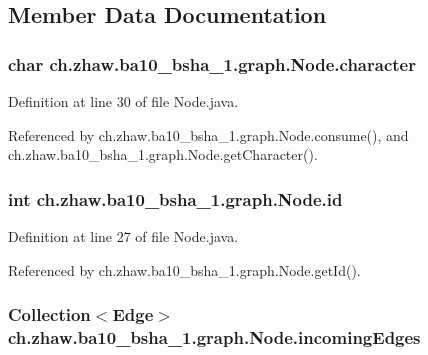 \subsection{Member Data Documentation}
\hypertarget{classch_1_1zhaw_1_1ba10__bsha__1_1_1graph_1_1Node_ab6bd424b381dc0f19d9f49d0b2cb56fc}{
\subsubsection[{character}]{\setlength{\rightskip}{0pt plus 5cm}char {\bf ch.zhaw.ba10\_\-bsha\_\-1.graph.Node.character}}}
\label{classch_1_1zhaw_1_1ba10__bsha__1_1_1graph_1_1Node_ab6bd424b381dc0f19d9f49d0b2cb56fc}


Definition at line 30 of file Node.java.

Referenced by ch.zhaw.ba10\_\-bsha\_\-1.graph.Node.consume(), and ch.zhaw.ba10\_\-bsha\_\-1.graph.Node.getCharacter().\hypertarget{classch_1_1zhaw_1_1ba10__bsha__1_1_1graph_1_1Node_a6ac4c87055132ff5de2f303d64baf0ba}{
\subsubsection[{id}]{\setlength{\rightskip}{0pt plus 5cm}int {\bf ch.zhaw.ba10\_\-bsha\_\-1.graph.Node.id}}}
\label{classch_1_1zhaw_1_1ba10__bsha__1_1_1graph_1_1Node_a6ac4c87055132ff5de2f303d64baf0ba}


Definition at line 27 of file Node.java.

Referenced by ch.zhaw.ba10\_\-bsha\_\-1.graph.Node.getId().\hypertarget{classch_1_1zhaw_1_1ba10__bsha__1_1_1graph_1_1Node_a588bea1c6cceb5f66e5e25115b9b12be}{
\subsubsection[{incomingEdges}]{\setlength{\rightskip}{0pt plus 5cm}Collection$<${\bf Edge}$>$ {\bf ch.zhaw.ba10\_\-bsha\_\-1.graph.Node.incomingEdges}}}
\label{classch_1_1zhaw_1_1ba10__bsha__1_1_1graph_1_1Node_a588bea1c6cceb5f66e5e25115b9b12be}


